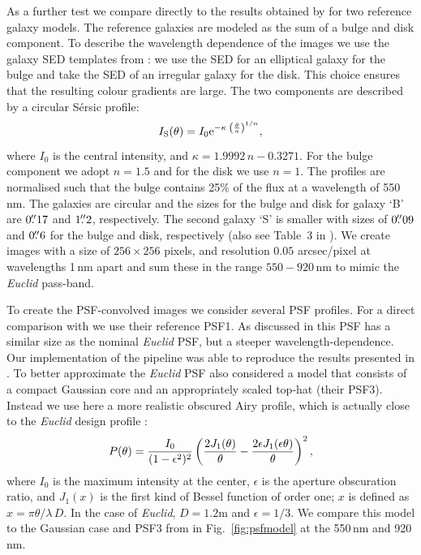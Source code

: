 \documentclass[useAMS,usenatbib]{mnras}
\newcommand{\be}{\begin{equation}}
\newcommand{\ee}{\end{equation}}
\newcommand{\rund}[1]{\left(#1\right)}
\def\elabel#1{\label{eq:#1}}
\begin{document}
As a further test we compare directly to the results obtained by  for two reference galaxy models.  The reference galaxies are modeled as the sum of a bulge and disk component. To describe the wavelength dependence of the images we use the galaxy SED templates from \citet{1980ApJS...43..393C}: we use the SED for an elliptical galaxy for the bulge and take the SED of an irregular galaxy for the disk. This choice ensures that the resulting colour gradients are large. The two components are  described by a circular S{\'e}rsic profile:
\be
I_{\rm S}(\theta) = I_0 {\rm e}^{-\kappa\; \left(\frac{\theta}{a}\right)^{1/n}},
\ee
%
where $I_0$ is the central intensity, and $\kappa=1.9992\,n -0.3271$. For the bulge component we adopt $n=1.5$ and for the disk we use $n=1$. The profiles are normalised such that the bulge contains 25\% of the flux at a wavelength of 550\,nm. The galaxies are circular and the sizes for the bulge and disk for galaxy `B'   are $0\hbox{$.\!\!^{\prime\prime}$}17$ and $1\hbox{$.\!\!^{\prime\prime}$}2$, respectively. The second galaxy `S' is smaller with sizes of $0\hbox{$.\!\!^{\prime\prime}$}09$ and $0\hbox{$.\!\!^{\prime\prime}$}6$  for the bulge and disk, respectively (also see Table~3 in ). We create images with a size of  $256\times256$ pixels, and resolution $0.05$ arcsec/pixel at wavelengths 1\,nm apart and sum these in the range $550-920$\,nm to mimic the {\it Euclid} pass-band.

To create the PSF-convolved images we consider several PSF profiles. For a direct comparison with  we use their reference PSF1. As discussed in  this PSF has a similar size as the nominal {\it Euclid} PSF, but a steeper wavelength-dependence. Our implementation of the pipeline was able to reproduce the results presented in .
To better approximate the {\it Euclid} PSF  also considered a model that  consists of a compact Gaussian core and an appropriately scaled top-hat (their PSF3). Instead we use here a more realistic obscured Airy profile, which is actually close to the {\it Euclid} design profile \citep{Laureijs11}:
%
\be
P(\theta) = {I_0 \over (1-\epsilon^2)^2} \rund{{2J_1(\theta)\over \theta} - 
{2\epsilon J_1(\epsilon \theta) \over \theta}}^2,
\elabel{psfairy}
\ee
%
where $I_0$ is the maximum intensity at the center, $\epsilon$ is the aperture obscuration ratio, and $J_1(x)$ is the first kind of Bessel function of order one; $x$ is defined as $x=\pi \theta/\lambda\, D $.
In the case of {\it Euclid}, $D=1.2$m and $\epsilon=1/3$. We compare this model to the Gaussian
case and PSF3 from  in Fig.~\ref{fig:psfmodel} at the 550\,nm and 920\,nm.
\end{document}
